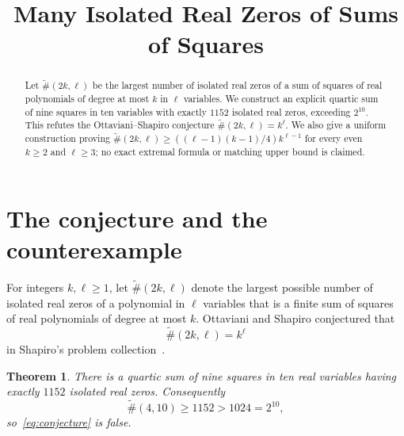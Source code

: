 \documentclass[a4paper,11pt]{amsart}
\title[Isolated zeros of sums of squares]{Many Isolated Real Zeros of Sums of Squares}
\date{}
\newtheorem{theorem}{Theorem}[section]
\theoremstyle{remark}
\begin{document}
\begin{abstract}
Let $\widetilde{\#}(2k,\ell)$ be the largest number of isolated real zeros of a sum of squares of real polynomials of degree at most $k$ in $\ell$ variables.  We construct an explicit quartic sum of nine squares in ten variables with exactly $1152$ isolated real zeros, exceeding $2^{10}$.  This refutes the Ottaviani--Shapiro conjecture $\widetilde{\#}(2k,\ell)=k^\ell$.  We also give a uniform construction proving $\widetilde{\#}(2k,\ell)\ge ((\ell-1)(k-1)/4)k^{\ell-1}$ for every even $k\ge2$ and $\ell\ge3$; no exact extremal formula or matching upper bound is claimed.
\end{abstract}

\maketitle

\section{The conjecture and the counterexample}

For integers $k,\ell\ge1$, let $\widetilde{\#}(2k,\ell)$ denote the largest possible number of isolated real zeros of a polynomial in $\ell$ variables that is a finite sum of squares of real polynomials of degree at most $k$. Ottaviani and Shapiro conjectured that
\begin{equation}\label{eq:conjecture}
 \widetilde{\#}(2k,\ell)=k^\ell
\end{equation}
in Shapiro's problem collection~\cite[Problem~3 and Conjecture~4]{Shapiro2015}.

\begin{theorem}\label{thm:counterexample}
There is a quartic sum of nine squares in ten real variables having exactly $1152$ isolated real zeros. Consequently
\[
 \widetilde{\#}(4,10)\ge1152>1024=2^{10},
\]
so~\eqref{eq:conjecture} is false.
\end{theorem}
\end{document}

